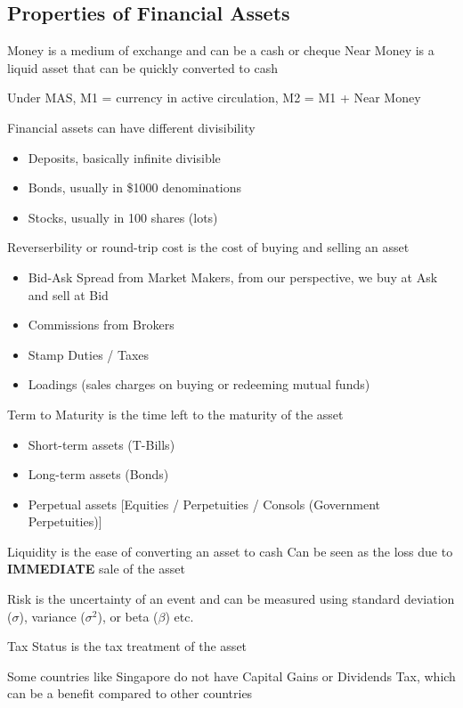 \subsection{Properties of Financial Assets}
    Money is a medium of exchange and can be a cash or cheque
    Near Money is a liquid asset that can be quickly converted to cash

    \begin{callout}
        Under MAS, M1 = currency in active circulation, M2 = M1 + Near Money
    \end{callout}
    Financial assets can have different divisibility
    \begin{itemize}
        \item Deposits, basically infinite divisible
        \item Bonds, usually in \$1000 denominations
        \item Stocks, usually in 100 shares (lots)
    \end{itemize}
    Reverserbility or round-trip cost is the cost of buying and selling an asset
    \begin{itemize}
        \item Bid-Ask Spread from Market Makers, from our perspective, we buy at Ask and sell at Bid
        \item Commissions from Brokers
        \item Stamp Duties / Taxes
        \item Loadings (sales charges on buying or redeeming mutual funds)
    \end{itemize}
    Term to Maturity is the time left to the maturity of the asset
    \begin{itemize}
        \item Short-term assets (T-Bills)
        \item Long-term assets (Bonds)
        \item Perpetual assets [Equities / Perpetuities / Consols (Government Perpetuities)]
    \end{itemize}
    Liquidity is the ease of converting an asset to cash
    Can be seen as the loss due to \textbf{IMMEDIATE} sale of the asset

    Risk is the uncertainty of an event and can be measured using standard deviation ($\sigma$), 
    variance ($\sigma^2$), or beta ($\beta$) etc.

    Tax Status is the tax treatment of the asset
    \begin{callout}
        Some countries like Singapore do not have Capital Gains or Dividends Tax, which 
        can be a benefit compared to other countries
    \end{callout}

